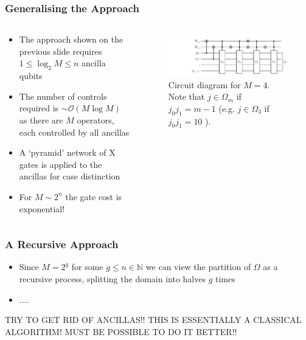 \documentclass{beamer}
\begin{document}
\begin{frame}
\frametitle{Generalising the Approach}
\begin{columns}
\begin{column}{0.4\textwidth}
\begin{itemize}
\item The approach shown on the previous slide requires $1 \leq  \log_2 M  \leq n $ ancilla qubits
\item The number of controls required is $\sim \mathcal{O}(M \log M)$ as there are $M$ operators, each controlled by all ancillas 
\item A `pyramid' network of X gates is applied to the ancillas for case distinction
\item For $M \sim 2^n$ the gate cost is exponential!
\end{itemize}
\end{column}
\begin{column}{0.6\textwidth}
\begin{figure}
\centering
\includegraphics[width=\textwidth]{im/circuit_4-fold}
\caption{Circuit diagram for $M=4$. Note that $j \in \Omega_m$ if $j_0j_1 =m-1$ (e.g. $j\in \Omega_3$ if $j_0 j_1 =10$ ).}
\end{figure}
\end{column}
\end{columns}
\end{frame}

\begin{frame}
\frametitle{A Recursive Approach}
\begin{itemize}
\item Since $M=2^g$ for some $g \leq n \in \mathbb{N}$ we can view the partition of $\Omega$ as a recursive process, splitting the domain into halves $g$ times
\item ....
\end{itemize}

TRY TO GET RID OF ANCILLAS!! THIS IS ESSENTIALLY A CLASSICAL ALGORITHM! MUST BE POSSIBLE TO DO IT BETTER!!
\end{frame}
\end{document}
